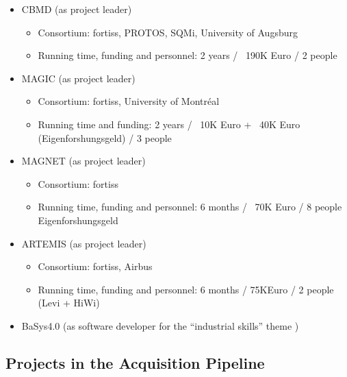 \documentclass{article}
\begin{document}
\begin{appendices}
\begin{itemize}
  \item CBMD (as project leader)
  \begin{itemize}
    \item Consortium: fortiss, PROTOS, SQMi, University of Augsburg
    \item Running time, funding and personnel: 2 years / ~190K Euro / 2 people
  \end{itemize} 
  \item MAGIC (as project leader)
  \begin{itemize}
    \item Consortium: fortiss, University of Montréal
    \item Running time and funding: 2 years / ~10K Euro + ~40K Euro
    (Eigenforshungsgeld) / 3 people
  \end{itemize} 
  \item MAGNET (as project leader)
  \begin{itemize}
    \item Consortium: fortiss
    \item Running time, funding and personnel: 6 months / ~70K Euro / 8 people
    Eigenforshungsgeld
  \end{itemize}
  \item ARTEMIS (as project leader)
  \begin{itemize}
    \item Consortium: fortiss, Airbus
    \item Running time, funding and personnel: 6 months / 75KEuro / 2 people
    (Levi + HiWi)
  \end{itemize} 
  \item BaSys4.0 (as software developer for the ``industrial skills'' theme )
\end{itemize}

\subsection{Projects in the Acquisition Pipeline}
\label{section:projects_in_pipepline}


\end{appendices}
\end{document}
